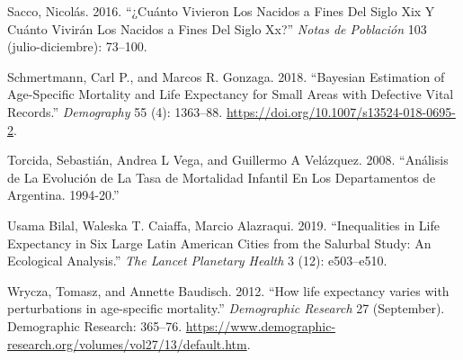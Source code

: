 \documentclass[12pt,]{article}
\begin{document}
\leavevmode\hypertarget{ref-Sacco2016}{}%
Sacco, Nicolás. 2016. ``¿Cuánto Vivieron Los Nacidos a Fines Del Siglo
Xix Y Cuánto Vivirán Los Nacidos a Fines Del Siglo Xx?'' \emph{Notas de
Población} 103 (julio-diciembre): 73--100.

\leavevmode\hypertarget{ref-Schmertmann2018}{}%
Schmertmann, Carl P., and Marcos R. Gonzaga. 2018. ``Bayesian Estimation
of Age-Specific Mortality and Life Expectancy for Small Areas with
Defective Vital Records.'' \emph{Demography} 55 (4): 1363--88.
\url{https://doi.org/10.1007/s13524-018-0695-2}.

\leavevmode\hypertarget{ref-Torcida2008}{}%
Torcida, Sebastián, Andrea L Vega, and Guillermo A Velázquez. 2008.
``Análisis de La Evolución de La Tasa de Mortalidad Infantil En Los
Departamentos de Argentina. 1994-20.''

\leavevmode\hypertarget{ref-Bilal2019}{}%
Usama Bilal, Waleska T. Caiaffa, Marcio Alazraqui. 2019. ``Inequalities
in Life Expectancy in Six Large Latin American Cities from the Salurbal
Study: An Ecological Analysis.'' \emph{The Lancet Planetary Health} 3
(12): e503--e510.

\leavevmode\hypertarget{ref-Wrycza2012}{}%
Wrycza, Tomasz, and Annette Baudisch. 2012. ``How life expectancy varies
with perturbations in age-specific mortality.'' \emph{Demographic
Research} 27 (September). Demographic Research: 365--76.
\url{https://www.demographic-research.org/volumes/vol27/13/default.htm}.
\end{document}

